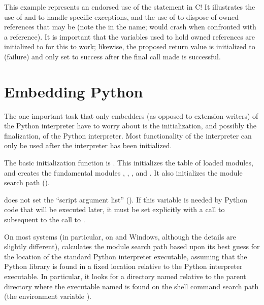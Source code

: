 This example represents an endorsed use of the  statement 
in C!  It illustrates the use of
 and
 to
handle specific exceptions, and the use of
 to
dispose of owned references that may be \NULL{} (note the
 in the name;  would crash when
confronted with a \NULL{} reference).  It is important that the
variables used to hold owned references are initialized to \NULL{} for
this to work; likewise, the proposed return value is initialized to
 (failure) and only set to success after the final call made
is successful.


\section{Embedding Python \label{embedding}}

The one important task that only embedders (as opposed to extension
writers) of the Python interpreter have to worry about is the
initialization, and possibly the finalization, of the Python
interpreter.  Most functionality of the interpreter can only be used
after the interpreter has been initialized.

The basic initialization function is
.
This initializes the table of loaded modules, and creates the
fundamental modules ,
, ,
and .  It also initializes
the module search path ().%

 does not set the ``script argument list'' 
().  If this variable is needed by Python code that 
will be executed later, it must be set explicitly with a call to 
 subsequent to the call to
.

On most systems (in particular, on \UNIX{} and Windows, although the
details are slightly different),
 calculates the module search path based
upon its best guess for the location of the standard Python
interpreter executable, assuming that the Python library is found in a
fixed location relative to the Python interpreter executable.  In
particular, it looks for a directory named
 relative to the parent directory where
the executable named  is found on the shell command
search path (the environment variable ).

